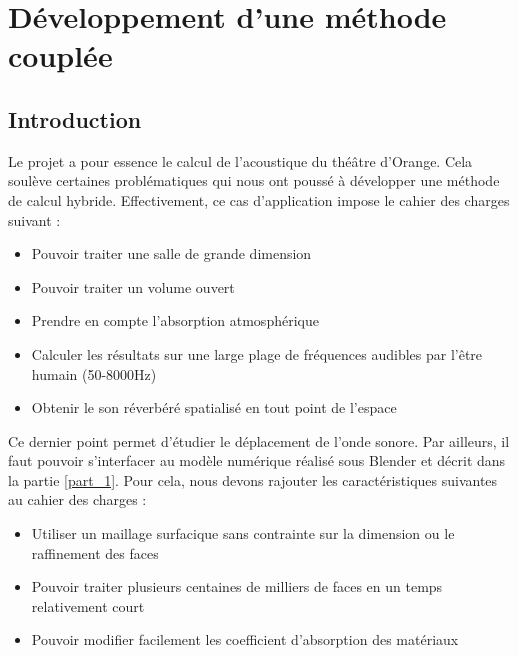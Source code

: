 
		
		
		
		
		
		
		
		
		
		
		
		
		
\chapter{Développement d'une méthode couplée}
	\minitoc
	\newpage
	
\section*{Introduction} \label{sect_methodecouplee}
Le projet a pour essence le calcul de l'acoustique du théâtre d'Orange. Cela soulève certaines problématiques qui nous ont poussé à développer une méthode de calcul hybride. Effectivement, ce cas d'application impose le cahier des charges suivant :
\begin{itemize}
	\item Pouvoir traiter une salle de grande dimension 
	\item Pouvoir traiter un volume ouvert
	\item Prendre en compte l'absorption atmosphérique
	\item Calculer les résultats sur une large plage de fréquences audibles par l'être humain (50-8000Hz)
	\item Obtenir le son réverbéré spatialisé en tout point de l'espace
\end{itemize}

Ce dernier point permet d'étudier le déplacement de l'onde sonore. Par ailleurs, il faut pouvoir s'interfacer au modèle numérique réalisé sous Blender et décrit dans la partie \ref{part_1}. Pour cela, nous devons rajouter les caractéristiques suivantes au cahier des charges :

\begin{itemize}
	\item Utiliser un maillage surfacique sans contrainte sur la dimension ou le raffinement des faces 
	\item Pouvoir traiter plusieurs centaines de milliers de faces en un temps relativement court 
	\item Pouvoir modifier facilement les coefficient d'absorption des matériaux
\end{itemize}

